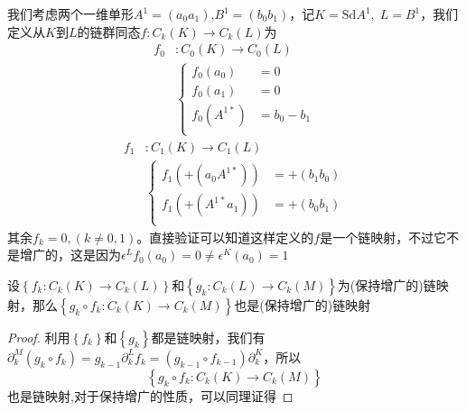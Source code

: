 \begin{example}
我们考虑两个一维单形$A^{1}=(a_{0}a_{1})$,$B^{1}=(b_{0}b_{1})$，记$K=\text{Sd}A^{1},\;L=B^{1}$，我们定义从$K$到$L$的链群同态$f:C_{k}(K)\rightarrow C_{k}(L)$为
\begin{equation*}
\begin{aligned}
f_{0}&:C_{0}(K)\rightarrow  C_{0}(L)\\
&\left\{\begin{array}{cc}
    f_{0}(a_{0})&=0\\
       f_{0}(a_{1})&=0\\
        f_{0}(A^{1*})&=b_{0}-b_{1}\\
\end{array}\right.
\end{aligned}
\end{equation*}
\begin{equation*}
\begin{aligned}
f_{1}&:C_{1}(K)\rightarrow  C_{1}(L)\\
&\left\{\begin{array}{cc}
   f_{1}(+(a_{0}A^{1*}))&=+(b_{1}b_{0})\\
     f_{1}(+(A^{1*}a_{1}))&=+(b_{0}b_{1})\\
\end{array}\right.
\end{aligned}
\end{equation*}
其余$f_{k}=0,(k\neq 0,1)$。直接验证可以知道这样定义的$f$是一个链映射，不过它不是增广的，这是因为$\epsilon^{L}f_{0}(a_{0})=0\neq\epsilon^{K}(a_{0})=1$
\end{example}
\begin{proposition}
设$\left\{f_{k}:C_{k}(K)\rightarrow C_{k}(L)\right\}$和$\left\{g_{k}:C_{k}(L)\rightarrow C_{k}(M)\right\}$为(保持增广的)链映射，那么$\left\{g_{k}\circ f_{k}:C_{k}(K)\rightarrow C_{k}(M)\right\}$也是(保持增广的)链映射
\end{proposition}
\begin{proof}
利用$\left\{f_{k}\right\}$和$\left\{g_{k}\right\}$都是链映射，我们有$\partial^{M}_{k}(g_{k}\circ f_{k})=g_{k-1}\partial^{L}_{k}f_{k}=(g_{k-1}\circ f_{k-1})\partial^{K}_{k}$，所以
\begin{equation*}
    \left\{g_{k}\circ f_{k}:C_{k}(K)\rightarrow C_{k}(M)\right\}
\end{equation*}
也是链映射,对于保持增广的性质，可以同理证得
\end{proof}
